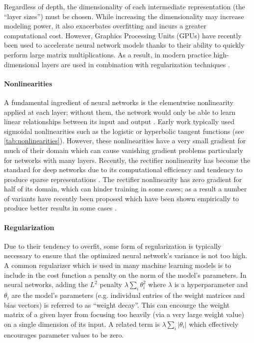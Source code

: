 Regardless of depth, the dimensionality of each intermediate representation (the ``layer sizes'') must be chosen.
While increasing the dimensionality may increase modeling power, it also exacerbates overfitting and incurs a greater computational cost.
However, Graphics Processing Units (GPUs) have recently been used to accelerate neural network models thanks to their ability to quickly perform large matrix multiplications.
As a result, in modern practice high-dimensional layers are used in combination with regularization techniques \cite{}.

\paragraph{Nonlinearities}

A fundamental ingredient of neural networks is the elementwise nonlinearity applied at each layer; without them, the network would only be able to learn linear relationships between its input and output \cite{}.
Early work typically used sigmoidal nonlinearities such as the logistic or hyperbolic tangent functions (see \cref{tab:nonlinearities}).
However, these nonlinearities have a very small gradient for much of their domain which can cause vanishing gradient problems particularly for networks with many layers.
Recently, the rectifier nonlinearity has become the standard for deep networks due to its computational efficiency and tendency to produce sparse representations \cite{}.
The rectifier nonlinearity has zero gradient for half of its domain, which can hinder training in some cases; as a result a number of variants have recently been proposed which have been shown empirically to produce better results in some cases \cite{}.

\paragraph{Regularization}

Due to their tendency to overfit, some form of regularization is typically necessary to ensure that the optimized neural network's variance is not too high.
A common regularizer which is used in many machine learning models is to include in the cost function a penalty on the norm of the model's parameters.
In neural networks, adding the $L^2$ penalty $\lambda \sum_i \theta_i^2$ where $\lambda$ is a hyperparameter and $\theta_i$ are the model's parameters (e.g. individual entries of the weight matrices and bias vectors) is referred to as ``weight decay''.
This can encourge the weight matrix of a given layer from focusing too heavily (via a very large weight value) on a single dimension of its input.
A related term is $\lambda \sum_i |\theta_i|$ which effectively encourages parameter values to be zero.

